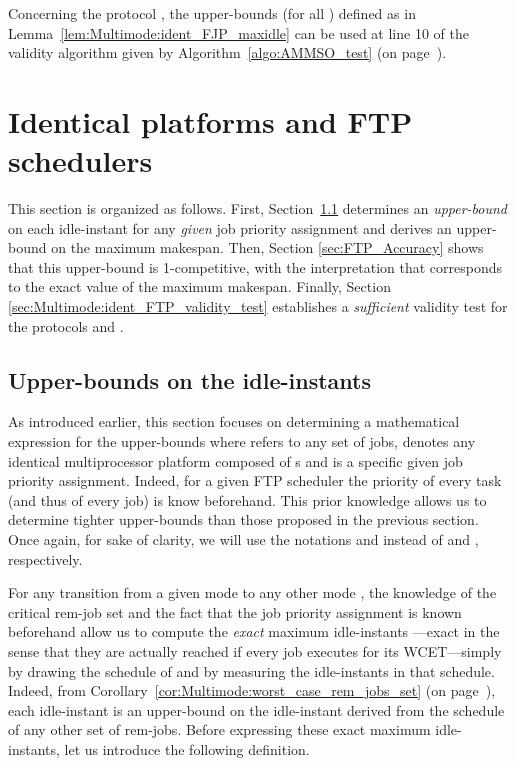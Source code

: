 \documentclass{article}
\newtheorem{validity test}{Validity Test}
\begin{document}
Concerning the protocol , the upper-bounds  (for all ) defined as in Lemma~\ref{lem:Multimode:ident_FJP_maxidle} can be used at line 10 of the validity algorithm given by Algorithm~\ref{algo:AMMSO_test} (on page~\pageref{algo:AMMSO_test}).
 



\section{Identical platforms and FTP schedulers}
\label{sec:Multimode:ident_FTP}

This section is organized as follows. First, Section~\ref{sec:Multimode:ident_FTP_upper_bounds} determines an \emph{upper-bound}  on each idle-instant  for any \emph{given} job priority assignment  and derives an upper-bound  on the maximum makespan. Then, Section \ref{sec:FTP_Accuracy} shows that this upper-bound  is 1-competitive, with the interpretation that  corresponds to the exact value of the maximum makespan. Finally, Section \ref{sec:Multimode:ident_FTP_validity_test} establishes a \emph{sufficient} validity test for the protocols  and . 

\subsection{Upper-bounds  on the idle-instants}
\label{sec:Multimode:ident_FTP_upper_bounds}

As introduced earlier, this section focuses on determining a mathematical expression for the upper-bounds  where  refers to any set of  jobs,  denotes any identical multiprocessor platform composed of  s and  is a specific given job priority assignment. Indeed, for a given FTP scheduler the priority of every task (and thus of every job) is know beforehand. This prior knowledge allows us to determine tighter upper-bounds than those proposed in the previous section. Once again, for sake of clarity, we will use the notations  and  instead of  and , respectively. 

For any transition from a given mode  to any other mode , the knowledge of the critical rem-job set  and the fact that the job priority assignment is known beforehand allow us to compute the \emph{exact} maximum idle-instants ---exact in the sense that they are actually reached if every job executes for its WCET---simply by drawing the schedule of  and by measuring the idle-instants  in that schedule. Indeed, from Corollary~\ref{cor:Multimode:worst_case_rem_jobs_set} (on page~\pageref{cor:Multimode:worst_case_rem_jobs_set}), each idle-instant  is an upper-bound on the idle-instant  derived from the schedule of any other set  of rem-jobs. Before expressing these exact maximum idle-instants, let us introduce the following definition. 
\end{document}
